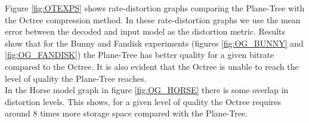 Figure \ref{fig:OTEXPS} shows rate-distortion graphs comparing the Plane-Tree with the Octree compression method. In these rate-distortion graphs we use the mean error between the decoded and input model as the distortion metric. Results show that for the Bunny and Fandisk experiments (figures \ref{fig:OG_BUNNY} and \ref{fig:OG_FANDISK}) the Plane-Tree has better quality for a given bitrate compared to the Octree. It is also evident that the Octree is unable to reach the level of quality the Plane-Tree reaches. \\

In the Horse model graph in figure \ref{fig:OG_HORSE} there is some overlap in distortion levels. This shows, for a given level of quality the Octree requires around 8 times more storage space compared with the Plane-Tree. \\


